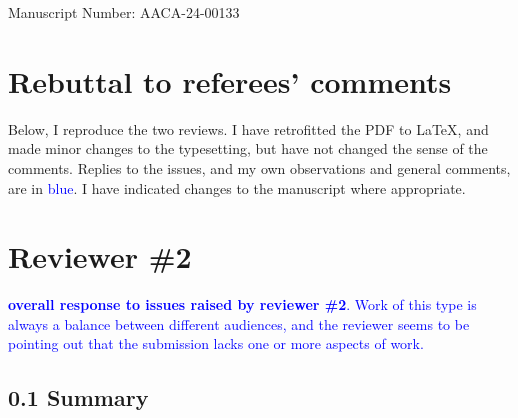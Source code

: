 \documentclass{article}
\begin{document}
Manuscript Number: AACA-24-00133

\section*{Rebuttal to referees' comments}

Below, I reproduce the two reviews.  I have retrofitted the PDF to
\LaTeX, and made minor changes to the typesetting, but have not
changed the sense of the comments.  Replies to the issues, and my own
observations and general comments, are in \textcolor{blue}{blue}.  I
have indicated changes to the manuscript where appropriate.


\section*{Reviewer \#2}

\textcolor{blue}{ {\bf overall response to issues raised by reviewer
    \#2}.  Work of this type is always a balance between different
  audiences, and the reviewer seems to be pointing out that the
  submission lacks one or more aspects of work.}

  
\subsection*{0.1 Summary}
\end{document}
